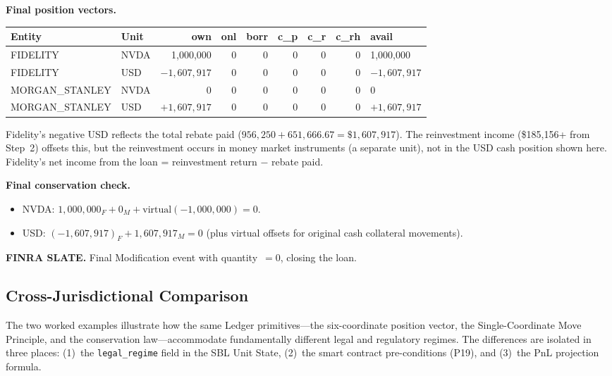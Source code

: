 \documentclass[11pt,a4paper]{article}
\begin{document}
\medskip
\noindent\textbf{Final position vectors.}

\begin{center}\small
\begin{tabular}{l l r r r r r r l}
\toprule
\textbf{Entity} & \textbf{Unit} & own & onl & borr & c\_p & c\_r & c\_rh & avail \\
\midrule
FIDELITY & NVDA & 1{,}000{,}000 & 0 & 0 & 0 & 0 & 0 & 1{,}000{,}000 \\
FIDELITY & USD & $-1{,}607{,}917$ & 0 & 0 & 0 & 0 & 0 & $-1{,}607{,}917$ \\
\midrule
MORGAN\_STANLEY & NVDA & 0 & 0 & 0 & 0 & 0 & 0 & 0 \\
MORGAN\_STANLEY & USD & $+1{,}607{,}917$ & 0 & 0 & 0 & 0 & 0 & $+1{,}607{,}917$ \\
\bottomrule
\end{tabular}
\end{center}

\noindent Fidelity's negative USD reflects the total rebate paid ($956{,}250 + 651{,}666.67 = \$1{,}607{,}917$). The reinvestment income (\$185{,}156+ from Step~2) offsets this, but the reinvestment occurs in money market instruments (a separate unit), not in the USD cash position shown here. Fidelity's net income from the loan = reinvestment return $-$ rebate paid.

\noindent\textbf{Final conservation check.}
\begin{itemize}[nosep]
\item NVDA: $1{,}000{,}000_F + 0_M + \text{virtual}(-1{,}000{,}000) = 0$. \checkmark
\item USD: $(-1{,}607{,}917)_F + 1{,}607{,}917_M = 0$ (plus virtual offsets for original cash collateral movements). \checkmark
\end{itemize}

\noindent\textbf{FINRA SLATE.} Final Modification event with quantity~$= 0$, closing the loan.

\subsection{Cross-Jurisdictional Comparison}
\label{sec:sbl-comparison}

The two worked examples illustrate how the same Ledger primitives---the six-coordinate position vector, the Single-Coordinate Move Principle, and the conservation law---accommodate fundamentally different legal and regulatory regimes. The differences are isolated in three places: (1)~the \texttt{legal\_regime} field in the SBL Unit State, (2)~the smart contract pre-conditions (P19), and (3)~the PnL projection formula.
\end{document}
